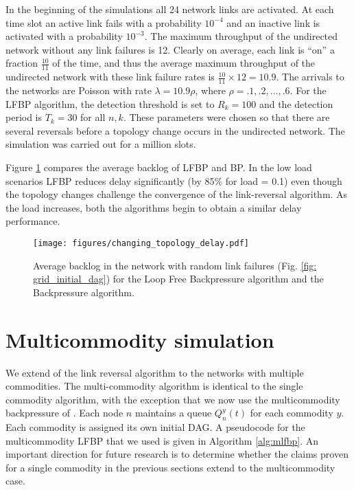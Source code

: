\documentclass{sig-alternate-2013}
\begin{document}
In the beginning of the simulations  all 24 network links are activated. At each time slot an active link fails with a probability $10^{-4}$ and an inactive link is activated with a probability $10^{-3}$. The maximum throughput of the undirected network without any link failures is 12. Clearly on average, each link is ``on'' a fraction $\frac{10}{11}$ of the time, and thus the average maximum throughput of the undirected network with these link failure rates is $\frac{10}{11}\times 12 = 10.9$. 
The arrivals to the networks are Poisson with rate $\lambda = 10.9\rho$, where $\rho = .1, .2, ..., .6$. For the LFBP algorithm, the detection threshold is set to $R_k = 100$ and the detection period is  $T_k = 30$ for all $n,k$. These parameters were chosen so that there are several reversals before a topology change occurs in the undirected network. The simulation was carried out for a million slots. 

Figure \ref{fig: changing_topology_delay} compares the average backlog of LFBP and BP. In the low load scenarios  LFBP reduces delay significantly (by 85\% for load = 0.1) even though the topology changes challenge the convergence of the link-reversal algorithm. As the load increases, both the algorithms begin to obtain a similar delay performance.

\begin{figure}[h]
\centering
\texttt{[image: figures/changing\_topology\_delay.pdf]}
\caption{Average backlog in the network with random link failures (Fig. \ref{fig: grid_initial_dag}) for the Loop Free Backpressure algorithm and the Backpressure algorithm.}
\label{fig: changing_topology_delay}
\end{figure}


\section{Multicommodity simulation}
We extend of the link reversal algorithm to the networks with multiple commodities. The multi-commodity algorithm is identical to the single commodity algorithm, with the exception that we now use the multicommodity backpressure of \cite{tassiulas}. Each node $n$ maintains a queue $Q^y_n(t)$ for each commodity $y$. Each commodity is assigned its own initial DAG. A pseudocode for the multicommodity LFBP that we used is given in Algorithm \ref{alg:mlfbp}. An important direction for future research is to determine whether the claims proven for a single commodity in the previous sections extend to the multicommodity case.
\end{document}
